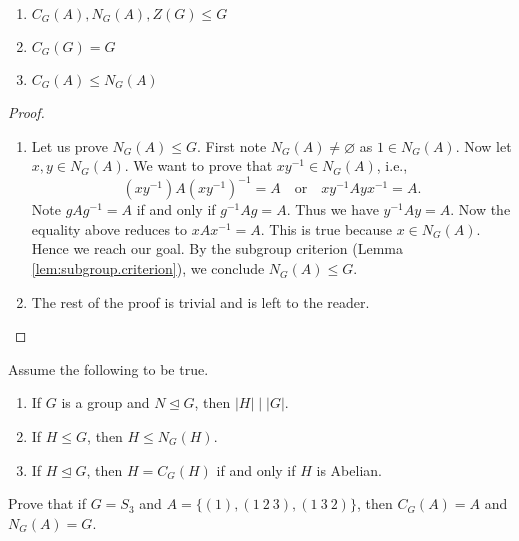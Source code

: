 \documentclass[11pt,a4paper]{article}
\begin{document}
\begin{prop}\hfill\null
    \begin{enumerate}[label=(\roman*)]
        \item \(C_G(A) , N_G(A), Z(G) \leq G\)
        \item \(C_G(G) = G\)
        \item \(C_G(A)\leq N_G(A)\)
    \end{enumerate}
\end{prop}

\begin{proof}
\begin{enumerate}[label=(\roman*)]
    \item Let us prove \(N_G(A) \leq G\).
    First note \(N_G(A)\neq \varnothing\) as \(1\in N_G(A)\).
    Now let \(x,y\in N_G(A)\).
    We want to prove that \(xy^{-1}\in N_G(A)\), i.e., 
    \[(xy^{-1})A(xy^{-1})^{-1} = A\quad\text{or}\quad xy^{-1}Ayx^{-1} = A.\]
    Note \(gAg^{-1} = A\) if and only if \(g^{-1}Ag=A\).
    Thus we have \(y^{-1}Ay = A\).
    Now the equality above reduces to 
    \(xAx^{-1}=A\). This is  true because \(x\in N_G(A)\).
    Hence we reach our goal.
    By the subgroup criterion (Lemma \ref{lem:subgroup.criterion}), we conclude \(N_G(A)\leq G\).


    \item The rest of the proof is trivial and is left to the reader.
\end{enumerate}
\end{proof}

\begin{eje}[Classwork]
    Assume the following to be true.
\begin{enumerate}[label=(\roman*)]
    \item If $G$ is a group and $N \trianglelefteq G$, then $|H| \mid |G|$.
    \item If $H \leq G$, then $H \leq N_G(H)$.
    \item If $H \trianglelefteq G$, then $H = C_G(H)$ if and only if $H$ is Abelian.
\end{enumerate}
Prove that if $G = S_3$ and $A = \{(1), (1\ 2\ 3), (1\ 3\ 2)\}$, then $C_G(A) = A$ and $N_G(A) = G$.
\end{eje}
\end{document}
